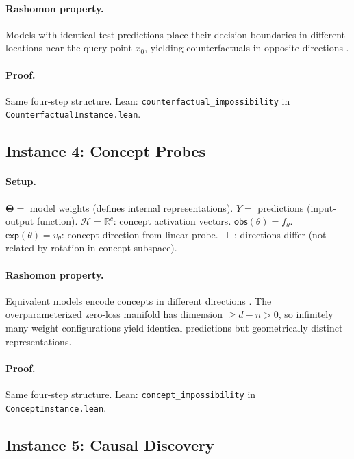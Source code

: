\documentclass[11pt,a4paper]{article}
\newcommand{\R}{\mathbb{R}}
\newcommand{\Params}{\mathbf{\Theta}}
\newcommand{\sH}{\mathcal{H}}
\newcommand{\incomp}{\perp}
\begin{document}
\paragraph{Rashomon property.}
Models with identical test predictions place their decision boundaries in
different locations near the query point $x_0$, yielding counterfactuals
in opposite directions \citep{semenova2022existence,fisher2019models}.

\paragraph{Proof.}
Same four-step structure.  Lean:
\texttt{counterfactual\_impossibility} in \texttt{Counterfactual\-Instance.lean}.

\subsection{Instance 4: Concept Probes}
\label{app:proof-concept}

\paragraph{Setup.}
$\Params ={}$ model weights (defines internal representations).
$Y ={}$ predictions (input-output function).
$\sH = \R^c$: concept activation vectors.
$\mathsf{obs}(\theta) = f_\theta$.
$\mathsf{exp}(\theta) = v_\theta$: concept direction from linear probe.
$\incomp$: directions differ (not related by rotation in concept subspace).

\paragraph{Rashomon property.}
Equivalent models encode concepts in different directions
\citep{bolukbasi2016man,kim2018tcav,ravfogel2020null}.  The
overparameterized zero-loss manifold has dimension $\geq d - n > 0$,
so infinitely many weight configurations yield identical predictions
but geometrically distinct representations.

\paragraph{Proof.}
Same four-step structure.  Lean:
\texttt{concept\_impossibility} in \texttt{ConceptInstance.lean}.

\subsection{Instance 5: Causal Discovery}
\label{app:proof-causal}
\end{document}
